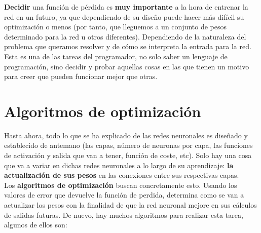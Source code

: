 \documentclass[11pt,fleqn]{book} %
\begin{document}
\textbf{Decidir} una función de pérdida es \textbf{muy importante} a la hora de entrenar la red en un futuro, ya que dependiendo de su diseño puede hacer más difícil su optimización o menos (por tanto, que lleguemos a un conjunto de pesos determinado para la red u otros diferentes). Dependiendo de la naturaleza del problema que queramos resolver y de cómo se interpreta la entrada para la red. \\

Esta es una de las tareas del programador, no solo saber un lenguaje de programación, sino decidir y probar aquellas cosas en las que tienen un motivo para creer que pueden funcionar mejor que otras.

\section{Algoritmos de optimización}\label{sec:optimizacion}

Hasta ahora, todo lo que se ha explicado de las redes neuronales es diseñado y establecido de antemano (las capas, número de neuronas por capa, las funciones de activación y salida que van a tener, función de coste, etc). Solo hay una cosa que va a variar en dichas redes neuronales a lo largo de su aprendizaje: \textbf{la actualización de sus pesos} en las conexiones entre sus respectivas capas. \\

Los \textbf{algoritmos de optimización} buscan concretamente esto. Usando los valores de error que devuelve la función de perdida, determina como se van a actualizar los pesos con la finalidad de que la red neuronal mejore en sus cálculos de salidas futuras. De nuevo, hay muchos algoritmos para realizar esta tarea, algunos de ellos son: \\
\end{document}
